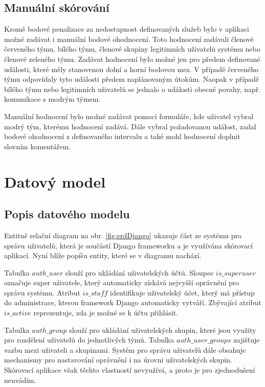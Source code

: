 \documentclass[
  digital, %
  twoside, %
  table,   %
  lof,     %
  lot,     %
]{fithesis3}
\begin{document}
\subsection{Manuální skórování}
Kromě bodové penalizace za nedostupnost definovaných služeb bylo v aplikaci možné zadávat i manuální bodové ohodnocení. Toto hodnocení zadávali členové červeného týmu, bílého týmu, členové skupiny legitimních uživatelů systému nebo členové zeleného týmu. Zadávat hodnocení bylo možné jen pro předem definované události, které měly stanovenou dolní a horní bodovou mez. V případě červeného týmu odpovídaly tyto události předem naplánovaným útokům. Naopak v případě bílého týmu nebo legitimních uživatelů se jednalo o události obecné povahy, např. komunikace s modrým týmem.

Manuální hodnocení bylo možné zadávat pomocí formuláře, kde uživatel vybral modrý tým, kterému hodnocení zadává. Dále vybral požadovanou událost, zadal bodové ohodnocení z definovaného intervalu a také mohl hodnocení doplnit slovním komentářem.

\section{Datový model}
\subsection{Popis datového modelu}

Entitně relační diagram na obr. \ref{fig:erdDjango} ukazuje část ze systému pro správu uživatelů, která je součástí Django frameworku a je využívána skórovací aplikací. Nyní blíže popíšu entity, které se v diagramu nachází.

Tabulka $auth\_user$ slouží pro ukládání uživatelských účtů. Sloupec $is\_superuser$ označuje super uživatele, který automaticky získává nejvyšší oprávnění pro správu systému. Atribut $is\_staff$ identifikuje uživatelský účet, který má přístup do administrace, kterou framework Django automaticky vytváří. Zbývající atribut $is\_active$ reprezentuje, zda je možné se k účtu přihlásit.

Tabulka $auth\_group$ slouží pro ukládání uživatelských skupin, které jsou využity pro rozdělení uživatelů do jednotlivých týmů. Tabulka $auth\_user\_groups$ zajišťuje vazbu mezi uživateli a skupinami. Systém pro správu uživatelů dále obsahuje mechanismy pro nastavování oprávnění i na úrovni uživatelských skupin. Skórovací aplikace však těchto vlastností nevyužívá, a proto je pro zjednodušení neuvádím.
\end{document}
